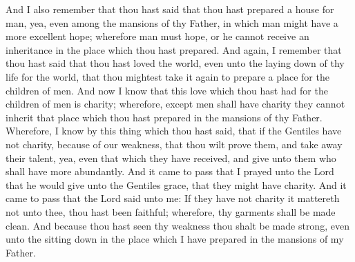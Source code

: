 And I also remember that thou hast said that thou hast prepared a house for man, yea, even among the mansions of thy Father, in which man might have a more excellent hope; wherefore man must hope, or he cannot receive an inheritance in the place which thou hast prepared.
\bverse \iffalse And again, I remember that thou hast said that thou hast loved the world, even unto the laying down of thy life for the world, that thou mightest take it again to prepare a place for the children of men. \fi
And again, I remember that thou hast said that thou hast loved the world, even unto the laying down of thy life for the world, that thou mightest take it again to prepare a place for the children of men.
\bverse \iffalse And now I know that this love which thou hast had for the children of men is charity; wherefore, except men shall have charity they cannot inherit that place which thou hast prepared in the mansions of thy Father. \fi
And now I know that this love which thou hast had for the children of men is charity; wherefore, except men shall have charity they cannot inherit that place which thou hast prepared in the mansions of thy Father.
\bverse \iffalse Wherefore, I know by this thing which thou hast said, that if the Gentiles have not charity, because of our weakness, that thou wilt prove them, and take away their talent, yea, even that which they have received, and give unto them who shall have more abundantly. \fi
Wherefore, I know by this thing which thou hast said, that if the Gentiles have not charity, because of our weakness, that thou wilt prove them, and take away their talent, yea, even that which they have received, and give unto them who shall have more abundantly.
\bverse \iffalse And it came to pass that I prayed unto the Lord that he would give unto the Gentiles grace, that they might have charity. \fi
And it came to pass that I prayed unto the Lord that he would give unto the Gentiles grace, that they might have charity.
\bverse \iffalse And it came to pass that the Lord said unto me: If they have not charity it mattereth not unto thee, thou hast been faithful; wherefore, thy garments shall be made clean. And because thou hast seen thy weakness thou shalt be made strong, even unto the sitting down in the place which I have prepared in the mansions of my Father. \fi
And it came to pass that the Lord said unto me: If they have not charity it mattereth not unto thee, thou hast been faithful; wherefore, thy garments shall be made clean. And because thou hast seen thy weakness thou shalt be made strong, even unto the sitting down in the place which I have prepared in the mansions of my Father.
